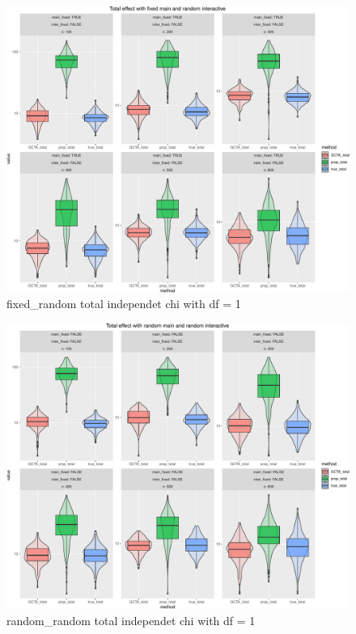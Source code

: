 \documentclass[]{article}
\begin{document}
\begin{figure}
\centering
\includegraphics{Decorrelation_method_and_their_effect_on_proposed_method_files/figure-latex/fixed_random-1.pdf}
\caption{fixed\_random total independet chi with df = 1}
\end{figure}

\begin{figure}
\centering
\includegraphics{Decorrelation_method_and_their_effect_on_proposed_method_files/figure-latex/random_random-1.pdf}
\caption{random\_random total independet chi with df = 1}
\end{figure}
\end{document}

